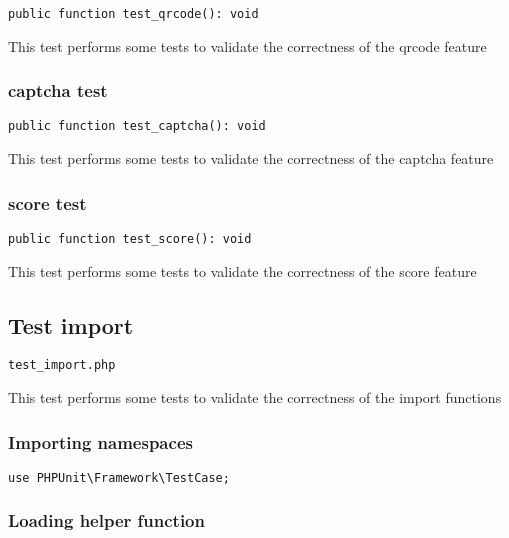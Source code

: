 \documentclass[a4paper]{article}
\begin{document}
\begin{lstlisting}
public function test_qrcode(): void
\end{lstlisting}

This test performs some tests to validate the correctness
of the qrcode feature

\hypertarget{toc223}{}
\subsubsection{captcha test}

\begin{lstlisting}
public function test_captcha(): void
\end{lstlisting}

This test performs some tests to validate the correctness
of the captcha feature

\hypertarget{toc224}{}
\subsubsection{score test}

\begin{lstlisting}
public function test_score(): void
\end{lstlisting}

This test performs some tests to validate the correctness
of the score feature

\hypertarget{toc225}{}
\subsection{Test import}

\begin{lstlisting}
test_import.php
\end{lstlisting}

This test performs some tests to validate the correctness
of the import functions

\hypertarget{toc226}{}
\subsubsection{Importing namespaces}

\begin{lstlisting}
use PHPUnit\Framework\TestCase;
\end{lstlisting}

\hypertarget{toc227}{}
\subsubsection{Loading helper function}
\end{document}
